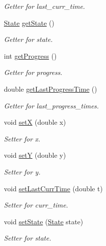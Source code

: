 \begin{DoxyCompactItemize}
\begin{DoxyCompactList}\small\item\em Getter for last\+\_\+curr\+\_\+time. \end{DoxyCompactList}\item 
\mbox{\hyperlink{_constants_8hpp_a5d74787dedbc4e11c1ab15bf487e61f8}{State}} \mbox{\hyperlink{class_aquatic_a3d73a0494585841ebd2acaee7281ece5}{get\+State}} ()
\begin{DoxyCompactList}\small\item\em Getter for state. \end{DoxyCompactList}\item 
int \mbox{\hyperlink{class_aquatic_a0de76e489d82ccad52dec32a1978850c}{get\+Progress}} ()
\begin{DoxyCompactList}\small\item\em Getter for progress. \end{DoxyCompactList}\item 
double \mbox{\hyperlink{class_aquatic_a60e1c0f173d0b37adce3cdd3d92efea0}{get\+Last\+Progress\+Time}} ()
\begin{DoxyCompactList}\small\item\em Getter for last\+\_\+progress\+\_\+times. \end{DoxyCompactList}\item 
void \mbox{\hyperlink{class_aquatic_a4f5f9426805afd153c659cd0bb535ef6}{setX}} (double x)
\begin{DoxyCompactList}\small\item\em Setter for x. \end{DoxyCompactList}\item 
void \mbox{\hyperlink{class_aquatic_af767ef441e7112a700975f6709b85dc9}{setY}} (double y)
\begin{DoxyCompactList}\small\item\em Setter for y. \end{DoxyCompactList}\item 
void \mbox{\hyperlink{class_aquatic_ae2fa11b1ff4a3763a7a7bd4924f6c1eb}{set\+Last\+Curr\+Time}} (double t)
\begin{DoxyCompactList}\small\item\em Setter for curr\+\_\+time. \end{DoxyCompactList}\item 
void \mbox{\hyperlink{class_aquatic_a33de0f838d9a6f504cd8efeaa112b4ea}{set\+State}} (\mbox{\hyperlink{_constants_8hpp_a5d74787dedbc4e11c1ab15bf487e61f8}{State}} state)
\begin{DoxyCompactList}\small\item\em Setter for state. \end{DoxyCompactList}\item 

\end{DoxyCompactItemize}
